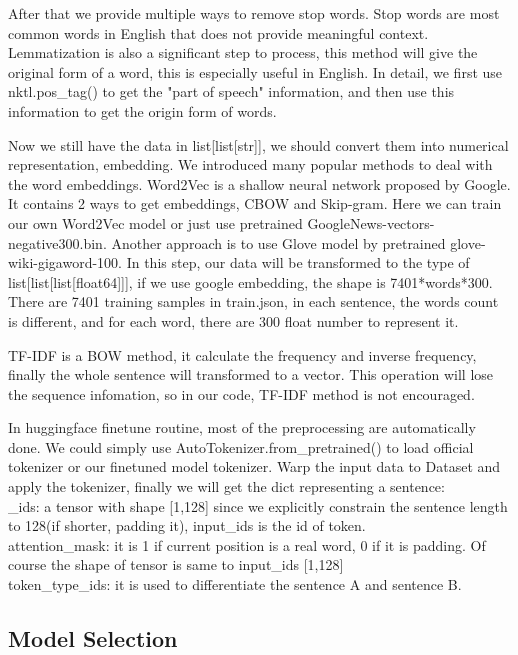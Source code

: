 \documentclass{article}
\begin{document}
After that we provide multiple ways to remove stop words. Stop words are most common words in English that does not provide meaningful context. \\Lemmatization is also a significant step to process, this method will give the original form of a word, this is especially useful in English. In detail, we first use nktl.pos\_tag() to get the "part of speech" information, and then use this information to get the origin form of words.

Now we still have the data in list[list[str]], we should convert them into numerical representation, embedding. We introduced many popular methods to deal with the word embeddings. Word2Vec is a shallow neural network proposed by Google. It contains 2 ways to get embeddings, CBOW and Skip-gram. Here we can train our own Word2Vec model or just use pretrained GoogleNews-vectors-negative300.bin. Another approach is to use Glove model by pretrained glove-wiki-gigaword-100. \hypertarget{hpb}{{}}In this step, our data will be transformed to the type of list[list[list[float64]]], if we use google embedding, the shape is 7401*words*300. There are 7401 training samples in train.json, in each sentence, the words count is different, and for each word, there are 300 float number to represent it.

TF-IDF is a BOW method, it calculate the frequency and inverse frequency, finally the whole sentence will transformed to a vector. This operation will lose the sequence infomation, so in our code, TF-IDF method is not encouraged.

In huggingface finetune routine, most of the preprocessing are automatically done. We could simply use AutoTokenizer.from\_pretrained() to load official tokenizer or our finetuned model tokenizer. Warp the input data to Dataset and apply the tokenizer, finally we will get the dict representing a sentence:\\_ids: a tensor with shape [1,128] since we explicitly constrain the sentence length to 128(if shorter, padding it), input\_ids is the id of token. \\attention\_mask: it is 1 if current position is a real word, 0 if it is padding. Of course the shape of tensor is same to input\_ids [1,128]\\token\_type\_ids: it is used to differentiate the sentence A and sentence B.

\subsection{Model Selection}
\end{document}
